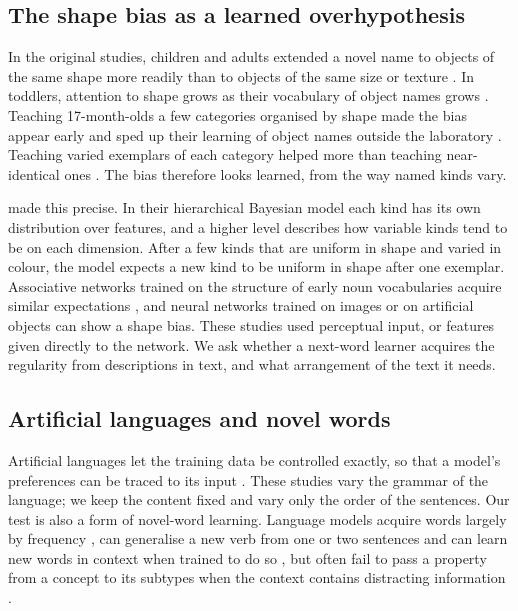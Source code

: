 \subsection{The shape bias as a learned overhypothesis}
In the original studies, children and adults extended a novel name to objects of the same shape more readily than to objects of the same size or texture \cite{landau1988}. In toddlers, attention to shape grows as their vocabulary of object names grows \cite{gershkoffstowe2004}. Teaching 17-month-olds a few categories organised by shape made the bias appear early and sped up their learning of object names outside the laboratory \cite{smith2002}. Teaching varied exemplars of each category helped more than teaching near-identical ones \cite{perry2010}. The bias therefore looks learned, from the way named kinds vary.

\citet{kemp2007} made this precise. In their hierarchical Bayesian model each kind has its own distribution over features, and a higher level describes how variable kinds tend to be on each dimension. After a few kinds that are uniform in shape and varied in colour, the model expects a new kind to be uniform in shape after one exemplar. Associative networks trained on the structure of early noun vocabularies acquire similar expectations \cite{colunga2005}, and neural networks trained on images \cite{ritter2017} or on artificial objects \cite{feinman2018} can show a shape bias. These studies used perceptual input, or features given directly to the network. We ask whether a next-word learner acquires the regularity from descriptions in text, and what arrangement of the text it needs.

\subsection{Artificial languages and novel words}
Artificial languages let the training data be controlled exactly, so that a model's preferences can be traced to its input \cite{mccoy2020,white2021,kallini2024}. These studies vary the grammar of the language; we keep the content fixed and vary only the order of the sentences. Our test is also a form of novel-word learning. Language models acquire words largely by frequency \cite{chang2022}, can generalise a new verb from one or two sentences \cite{thrush2020} and can learn new words in context when trained to do so \cite{wang2025}, but often fail to pass a property from a concept to its subtypes when the context contains distracting information \cite{misra2023}.


